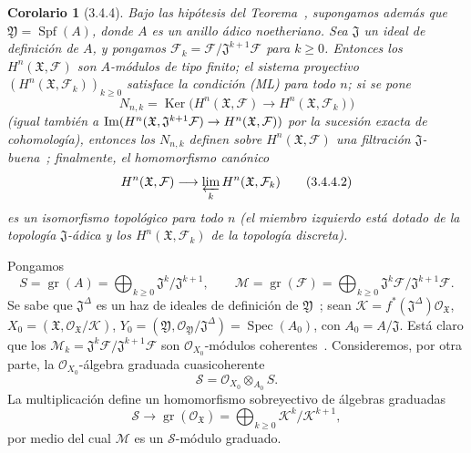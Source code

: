 \documentclass[10pt,oneside,openany]{book}
\theoremstyle{egaenv}\newtheorem*{env}{---}
\theoremstyle{egastatement}
\newtheorem*{corollary}{Corolario}
\theoremstyle{egadescription}
\renewcommand{\geq}{\geqslant}
\renewcommand{\to}{\mathchoice{\longrightarrow}{\rightarrow}{\rightarrow}{\rightarrow}}
\begin{document}
\begin{corollary}[3.4.4]
\label{III.3.4.4}
\label{III.3.4.4-fr}
Bajo las hipótesis del Teorema~, supongamos además que $\mathfrak Y=\operatorname{Spf}(A)$, donde $A$ es un anillo ádico noetheriano.
Sea $\mathfrak J$ un ideal de definición de $A$, y pongamos $\mathcal F_k=\mathcal F/\mathfrak J^{k+1}\mathcal F$ para $k\geq0$.
Entonces los $H^n(\mathfrak X,\mathcal F)$ son $A$-módulos de tipo finito; el sistema proyectivo $(H^n(\mathfrak X,\mathcal F_k))_{k\geq0}$ satisface la condición \emph{(ML)} para todo $n$; si se pone
\[
N_{n,k}=\operatorname{Ker}\bigl(H^n(\mathfrak X,\mathcal F)
\longrightarrow H^n(\mathfrak X,\mathcal F_k)\bigr)
\tag{3.4.4.1}\label{III.3.4.4.1-fr}
\]
(igual también a $\operatorname{Im}(H^n(\mathfrak X,\mathfrak J^{k+1}\mathcal F)
\to H^n(\mathfrak X,\mathcal F))$ por la sucesión exacta de cohomología), entonces los $N_{n,k}$ definen sobre $H^n(\mathfrak X,\mathcal F)$ una filtración $\mathfrak J$-buena~; finalmente, el homomorfismo canónico
\[
H^n(\mathfrak X,\mathcal F)
\longrightarrow\varprojlim_kH^n(\mathfrak X,\mathcal F_k)
\tag{3.4.4.2}\label{III.3.4.4.2-fr}
\]
es un isomorfismo topológico para todo $n$ (el miembro izquierdo está dotado de la topología $\mathfrak J$-ádica y los $H^n(\mathfrak X,\mathcal F_k)$ de la topología discreta).
\end{corollary}

Pongamos
\[
S=\operatorname{gr}(A)=\bigoplus_{k\geq0}
\mathfrak J^k/\mathfrak J^{k+1},\qquad
\mathcal M=\operatorname{gr}(\mathcal F)=\bigoplus_{k\geq0}
\mathfrak J^k\mathcal F/\mathfrak J^{k+1}\mathcal F.
\tag{3.4.4.3}\label{III.3.4.4.3-fr}
\]
Se sabe que $\mathfrak J^\Delta$ es un haz de ideales de definición de $\mathfrak Y$~; sean $\mathcal K=f^*(\mathfrak J^\Delta)\mathcal O_{\mathfrak X}$, $X_0=(\mathfrak X,\mathcal O_{\mathfrak X}/\mathcal K)$, $Y_0=(\mathfrak Y,\mathcal O_{\mathfrak Y}/\mathfrak J^\Delta)
=\operatorname{Spec}(A_0)$, con $A_0=A/\mathfrak J$.
Está claro que los $\mathcal M_k=\mathfrak J^k\mathcal F/\mathfrak J^{k+1}\mathcal F$ son $\mathcal O_{X_0}$-módulos coherentes~.
Consideremos, por otra parte, la $\mathcal O_{X_0}$-álgebra graduada cuasicoherente
\[
\mathcal S=\mathcal O_{X_0}\otimes_{A_0}S.
\tag{3.4.4.4}\label{III.3.4.4.4-fr}
\]
La multiplicación define un homomorfismo sobreyectivo de álgebras graduadas
\[
\mathcal S\longrightarrow
\operatorname{gr}(\mathcal O_{\mathfrak X})
=\bigoplus_{k\geq0}\mathcal K^k/\mathcal K^{k+1},
\]
por medio del cual $\mathcal M$ es un $\mathcal S$-módulo graduado.
\end{document}
